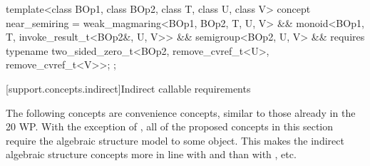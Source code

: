 \begin{itemdecl}
  template<class BOp1, class BOp2, class T, class U, class V>
  concept near_semiring = weak_magmaring<BOp1, BOp2, T, U, V> &&
    monoid<BOp1, T, invoke_result_t<BOp2&, U, V>> && semigroup<BOp2, U, V> && requires {
      typename two_sided_zero_t<BOp2, remove_cvref_t<U>, remove_cvref_t<V>>;
    };
\end{itemdecl}

[support.concepts.indirect]{Indirect callable requirements}

The following concepts are convenience concepts, similar to those already in the \Cpp{}20 WP. With
the exception of , all of the proposed concepts in this
section require the algebraic structure model  to some object. This makes the
indirect algebraic structure concepts more in line with  and  than
with , etc.

